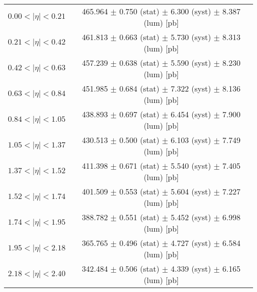 \begin{tabular}{lc}
\hline
$0.00 < |\eta| <0.21$          & 465.964 $\pm$ 0.750 (stat) $\pm$ 6.300 (syst) $\pm$ 8.387 (lum) [pb]  \\
$0.21 < |\eta| <0.42$          & 461.813 $\pm$ 0.663 (stat) $\pm$ 5.730 (syst) $\pm$ 8.313 (lum) [pb]  \\
$0.42 < |\eta| <0.63$          & 457.239 $\pm$ 0.638 (stat) $\pm$ 5.590 (syst) $\pm$ 8.230 (lum) [pb]  \\
$0.63 < |\eta| <0.84$          & 451.985 $\pm$ 0.684 (stat) $\pm$ 7.322 (syst) $\pm$ 8.136 (lum) [pb]  \\
$0.84 < |\eta| <1.05$          & 438.893 $\pm$ 0.697 (stat) $\pm$ 6.454 (syst) $\pm$ 7.900 (lum) [pb]  \\
$1.05 < |\eta| <1.37$          & 430.513 $\pm$ 0.500 (stat) $\pm$ 6.103 (syst) $\pm$ 7.749 (lum) [pb]  \\
$1.37 < |\eta| <1.52$          & 411.398 $\pm$ 0.671 (stat) $\pm$ 5.540 (syst) $\pm$ 7.405 (lum) [pb]  \\
$1.52 < |\eta| <1.74$          & 401.509 $\pm$ 0.553 (stat) $\pm$ 5.604 (syst) $\pm$ 7.227 (lum) [pb]  \\
$1.74 < |\eta| <1.95$          & 388.782 $\pm$ 0.551 (stat) $\pm$ 5.452 (syst) $\pm$ 6.998 (lum) [pb]  \\
$1.95 < |\eta| <2.18$          & 365.765 $\pm$ 0.496 (stat) $\pm$ 4.727 (syst) $\pm$ 6.584 (lum) [pb]  \\
$2.18 < |\eta| <2.40$          & 342.484 $\pm$ 0.506 (stat) $\pm$ 4.339 (syst) $\pm$ 6.165 (lum) [pb]  \\
\hline
\end{tabular}
